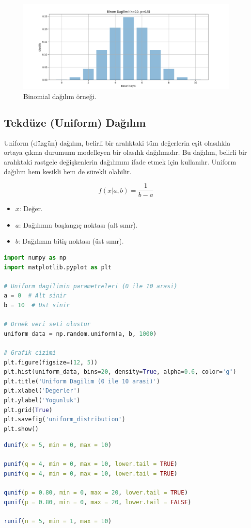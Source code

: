\begin{figure}[h]
    \centering
    \includegraphics[width=1\textwidth]{images/binomial_distribution.png}
    \caption{Binomial dağılım örneği.}
    \label{fig:enter-label}
\end{figure}

\subsection{Tekdüze (Uniform) Dağılım}
Uniform (düzgün) dağılım, belirli bir aralıktaki tüm değerlerin eşit olasılıkla ortaya çıkma durumunu modelleyen bir olasılık dağılımıdır. Bu dağılım, belirli bir aralıktaki rastgele değişkenlerin dağılımını ifade etmek için kullanılır. Uniform dağılım hem kesikli hem de sürekli olabilir.

\[f(x|a,b) = \frac{1}{b-a}\]
\begin{itemize}
	\item $x$: Değer.
	\item $a$: Dağılımın başlangıç noktası (alt sınır).
	\item $b$: Dağılımın bitiş noktası (üst sınır).
\end{itemize}

\begin{lstlisting}[language=Python]
import numpy as np
import matplotlib.pyplot as plt

# Uniform dagilimin parametreleri (0 ile 10 arasi)
a = 0  # Alt sinir
b = 10  # Ust sinir

# Ornek veri seti olustur
uniform_data = np.random.uniform(a, b, 1000)

# Grafik cizimi
plt.figure(figsize=(12, 5))
plt.hist(uniform_data, bins=20, density=True, alpha=0.6, color='g')
plt.title('Uniform Dagilim (0 ile 10 arasi)')
plt.xlabel('Degerler')
plt.ylabel('Yogunluk')
plt.grid(True)
plt.savefig('uniform_distribution')
plt.show()
\end{lstlisting}

\begin{lstlisting}[language=R]
dunif(x = 5, min = 0, max = 10)

punif(q = 4, min = 0, max = 10, lower.tail = TRUE)
punif(q = 4, min = 0, max = 10, lower.tail = TRUE)

qunif(p = 0.80, min = 0, max = 20, lower.tail = TRUE)
qunif(p = 0.80, min = 0, max = 20, lower.tail = FALSE)

runif(n = 5, min = 1, max = 10)
\end{lstlisting}


